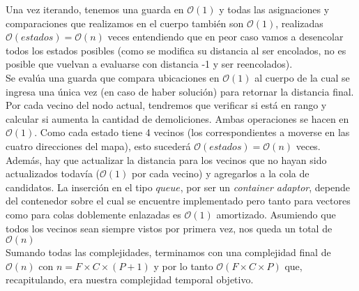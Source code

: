     Una vez iterando, tenemos una guarda en $\mathcal{O}(1)$ y todas las asignaciones y comparaciones que realizamos en el cuerpo también son $\mathcal{O}(1)$, realizadas $\mathcal{O}(estados) = \mathcal{O}(n)$ veces entendiendo que en peor caso vamos a desencolar todos los estados posibles (como se modifica su distancia al ser encolados, no es posible que vuelvan a evaluarse con distancia -1 y ser reencolados).
    \\

    Se evalúa una guarda que compara ubicaciones en $\mathcal{O}(1)$ al cuerpo de la cual se ingresa una única vez (en caso de haber solución) para retornar la distancia final.
    \\

    Por cada vecino del nodo actual, tendremos que verificar si está en rango y calcular si aumenta la cantidad de demoliciones. Ambas operaciones se hacen en $\mathcal{O}(1)$. Como cada estado tiene 4 vecinos (los correspondientes a moverse en las cuatro direcciones del mapa), esto sucederá $\mathcal{O}(estados) = \mathcal{O}(n) $ veces. Además, hay que actualizar la distancia para los vecinos que no hayan sido actualizados todavía ($\mathcal{O}(1)$ por cada vecino) y agregarlos a la cola de candidatos. La inserción en el tipo $queue$, por ser un \emph{container adaptor}, depende del contenedor sobre el cual se encuentre implementado pero tanto para vectores como para colas doblemente enlazadas es $\mathcal{O}(1)$ amortizado. Asumiendo que todos los vecinos sean siempre vistos por primera vez, nos queda un total de $\mathcal{O}(n)$
    \\

    Sumando todas las complejidades, terminamos con una complejidad final de $\mathcal{O}(n)$ con $n = F\times C\times (P+1)$ y por lo tanto $\mathcal{O}(F\times C\times P)$ que, recapitulando, era nuestra complejidad temporal objetivo.
